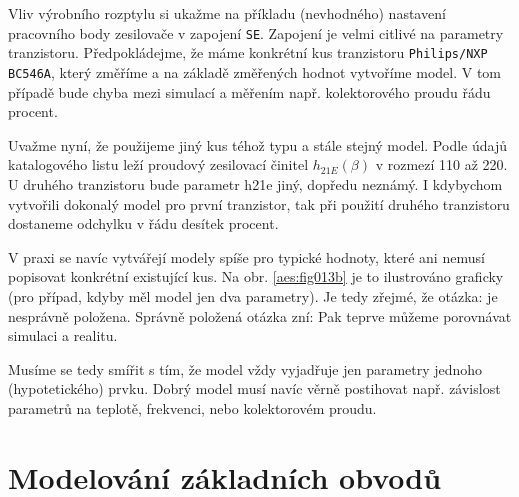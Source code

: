         \begin{tcnote}
          Vliv výrobního rozptylu si ukažme na příkladu (nevhodného) nastavení pracovního body
          zesilovače v zapojení \texttt{SE}. Zapojení je velmi citlivé na parametry tranzistoru.
          Předpokládejme, že máme konkrétní kus tranzistoru \texttt{Philips/NXP BC546A}, který
          změříme a na základě změřených hodnot vytvoříme model. V tom případě bude chyba mezi
          simulací a měřením např. kolektorového proudu řádu procent.
          
          {\centering
          \captionsetup{type=figure}
            \hspace{1em} 
           \par}

        Uvažme nyní, že použijeme jiný kus téhož typu a stále stejný model. Podle údajů katalogového
        listu leží proudový zesilovací činitel \(h_{21E}(\beta)\) v rozmezí \num{110} až \num{220}.
        U druhého tranzistoru bude parametr h21e jiný, dopředu neznámý. I kdybychom vytvořili
        dokonalý model pro první tranzistor, tak při použití druhého tranzistoru dostaneme odchylku
        v řádu desítek procent.

        V praxi se navíc vytvářejí modely spíše pro typické hodnoty, které ani nemusí popisovat
        konkrétní existující kus. Na obr. \ref{aes:fig013b}  je to ilustrováno graficky (pro případ,
        kdyby měl model jen dva parametry). Je tedy zřejmé, že otázka:  je nesprávně položena. Správně položená otázka zní:  Pak teprve
        můžeme porovnávat simulaci a realitu.

        Musíme se tedy smířit s tím, že model vždy vyjadřuje jen parametry jednoho (hypotetického)
        prvku. Dobrý model musí navíc věrně postihovat např. závislost parametrů na teplotě,
        frekvenci, nebo kolektorovém proudu.
      \end{tcnote} 

  \section{Modelování základních obvodů}
